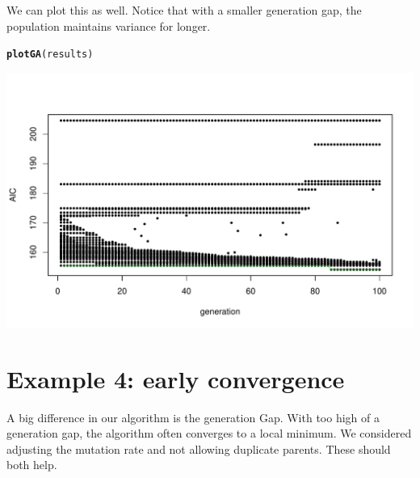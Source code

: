 \documentclass{article}\usepackage[]{graphicx}\usepackage[]{color}
\makeatletter
\def\maxwidth{ %
  \ifdim\Gin@nat@width>\linewidth
    \linewidth
  \else
    \Gin@nat@width
  \fi
}
\newcommand{\hlstd}[1]{\textcolor[rgb]{0.345,0.345,0.345}{#1}}%
\newcommand{\hlkwd}[1]{\textcolor[rgb]{0.737,0.353,0.396}{\textbf{#1}}}%
\newenvironment{kframe}{%
 \def\at@end@of@kframe{}%
 \ifinner\ifhmode%
  \def\at@end@of@kframe{\end{minipage}}%
  \begin{minipage}{\columnwidth}%
 \fi\fi%
 \def\FrameCommand##1{\hskip\@totalleftmargin \hskip-\fboxsep
 \colorbox{shadecolor}{##1}\hskip-\fboxsep
     \hskip-\linewidth \hskip-\@totalleftmargin \hskip\columnwidth}%
 \MakeFramed {\advance\hsize-\width
   \@totalleftmargin\z@ \linewidth\hsize
   \@setminipage}}%
 {\par\unskip\endMakeFramed%
 \at@end@of@kframe}
\newenvironment{knitrout}{}{} %
\makeatother
\begin{document}
We can plot this as well. Notice that with a smaller generation gap, the population maintains variance for longer.
\begin{knitrout}
\color{fgcolor}\begin{kframe}
\begin{alltt}
\hlkwd{plotGA}\hlstd{(results)}
\end{alltt}
\end{kframe}
\includegraphics[width=\maxwidth]{figure/r-chunk6b-1} 

\end{knitrout}

\section*{Example 4: early convergence}

A big difference in our algorithm is the generation Gap. With too high of a generation gap, the algorithm often converges to a local minimum. We considered adjusting the mutation rate and not allowing duplicate parents. These should both help.
\end{document}
